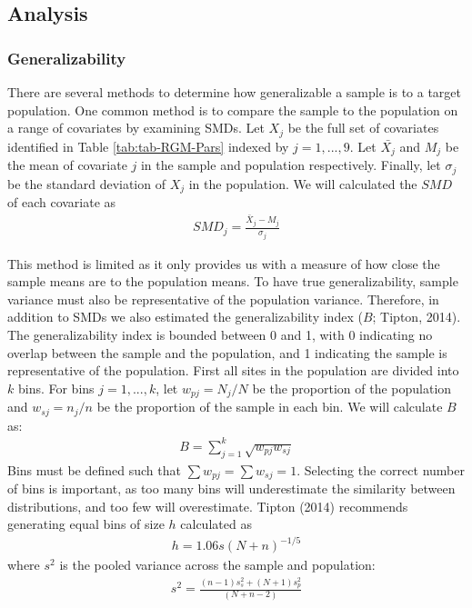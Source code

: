 \documentclass[man,floatsintext]{apa6}
\begin{document}
\hypertarget{analysis}{%
\subsection{Analysis}\label{analysis}}

\hypertarget{generalizability}{%
\subsubsection{Generalizability}\label{generalizability}}

There are several methods to determine how generalizable a sample is to a target population. One common method is to compare the sample to the population on a range of covariates by examining SMDs. Let \(X_j\) be the full set of covariates identified in Table \ref{tab:tab-RGM-Pars} indexed by \(j = 1,...,9\). Let \(\bar{X_j}\) and \(M_j\) be the mean of covariate \(j\) in the sample and population respectively. Finally, let \(\sigma_j\) be the standard deviation of \(X_j\) in the population. We will calculated the \(SMD\) of each covariate as
\begin{align}
  SMD_{j} = \frac{\bar{X}_{j}-M_{j}}{\sigma_{j}}
\end{align}

This method is limited as it only provides us with a measure of how close the sample means are to the population means. To have true generalizability, sample variance must also be representative of the population variance. Therefore, in addition to SMDs we also estimated the generalizability index (\(B\); Tipton, 2014). The generalizability index is bounded between 0 and 1, with 0 indicating no overlap between the sample and the population, and 1 indicating the sample is representative of the population. First all sites in the population are divided into \(k\) bins. For bins \(j = 1,...,k\), let \(w_{pj} = N_j/N\) be the proportion of the population and \(w_{sj} = n_j/n\) be the proportion of the sample in each bin. We will calculate \(B\) as:
\begin{align}
  B = \sum^k_{j=1}\sqrt{w_{pj}w_{sj}}
\end{align}
Bins must be defined such that \(\sum{w_{pj}} = \sum{w_{sj}} = 1\). Selecting the correct number of bins is important, as too many bins will underestimate the similarity between distributions, and too few will overestimate. Tipton (2014) recommends generating equal bins of size \(h\) calculated as
\begin{align}
  h = 1.06s(N+n)^{-1/5}
\end{align}
where \(s^2\) is the pooled variance across the sample and population:
\begin{align}
  s^2 = \frac{(n - 1)s^2_s + (N + 1)s^2_p}{(N + n - 2)}
\end{align}
\end{document}
